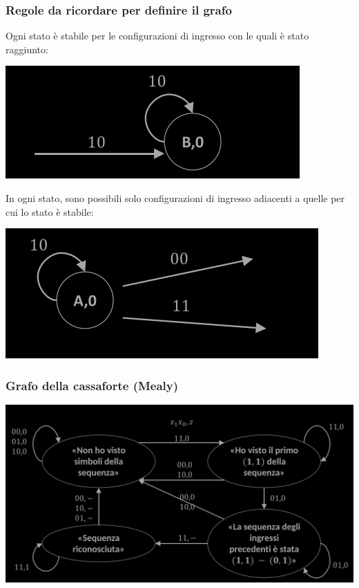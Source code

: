 \documentclass{article}
\begin{document}
\subsubsection*{Regole da ricordare per definire il grafo}
Ogni stato è stabile per le configurazioni di ingresso con le quali è stato raggiunto:
\begin{center}
    \includegraphics[scale=0.4]{esGrafo1.png}
\end{center}
In ogni stato, sono possibili solo configurazioni di ingresso adiacenti a quelle per cui lo stato è stabile:
\begin{center}
    \includegraphics[scale=0.4]{esGrafo2.png}
\end{center}

\subsubsection{Grafo della cassaforte (Mealy)}
\begin{center}
    \includegraphics[scale=0.65]{cassaforteMealy.png}
\end{center}
\end{document}
